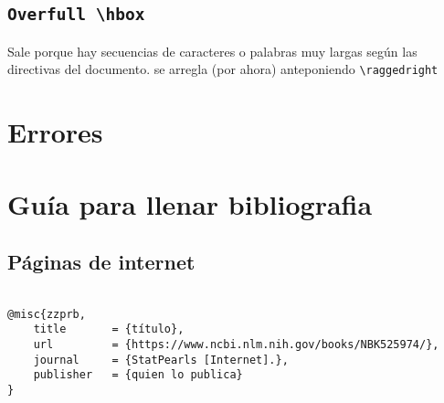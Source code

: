 \subsection{\texttt{Overfull \textbackslash hbox}}

Sale porque hay secuencias de caracteres o palabras muy largas según las directivas del documento. se arregla (por ahora) anteponiendo \texttt{\textbackslash raggedright}

\section{Errores}


\section{Guía para llenar bibliografia}


\subsection{Páginas de internet}
\begin{verbatim}

@misc{zzprb,
    title       = {título},
    url         = {https://www.ncbi.nlm.nih.gov/books/NBK525974/},
    journal     = {StatPearls [Internet].},
    publisher   = {quien lo publica}
}
\end{verbatim}